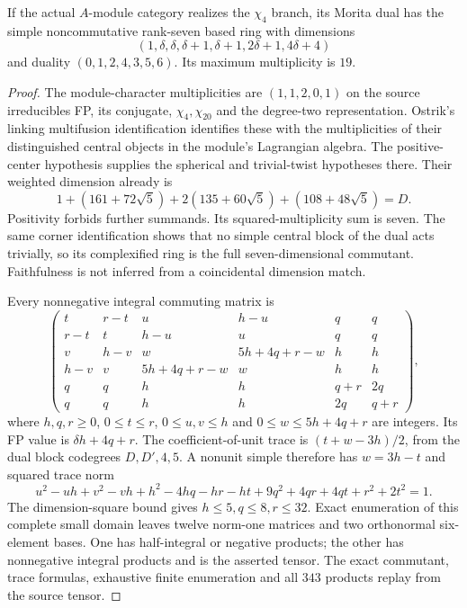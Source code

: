 \begin{proposition}\label{prop:r1154-conditional-rank7}
If the actual $A$-module category realizes the $\chi_4$ branch,
its Morita dual has the simple noncommutative rank-seven based ring
with dimensions
\[
(1,\delta,\delta,\delta+1,\delta+1,2\delta+1,4\delta+4)
\]
and duality $(0,1,2,4,3,5,6)$. Its maximum multiplicity is $19$.
\end{proposition}
\begin{proof}
The module-character multiplicities are $(1,1,2,0,1)$ on the source
irreducibles FP, its conjugate, $\chi_4,\chi_{20}$ and the degree-two
representation. Ostrik's linking multifusion identification
\cite[Remark~2.19]{OstrikPiv3} identifies these with the multiplicities
of their distinguished central objects in the module's Lagrangian
algebra. The positive-center hypothesis supplies the spherical and
trivial-twist hypotheses there. Their weighted dimension already is
\[
1+(161+72\sqrt5)+2(135+60\sqrt5)+(108+48\sqrt5)=D.
\]
Positivity forbids further summands. Its squared-multiplicity sum is
seven. The same corner identification shows that no simple central
block of the dual acts trivially, so its complexified ring is the full
seven-dimensional commutant. Faithfulness is not inferred from a
coincidental dimension match.

Every nonnegative integral commuting matrix is
\[
\begin{pmatrix}
t&r-t&u&h-u&q&q\\
r-t&t&h-u&u&q&q\\
v&h-v&w&5h+4q+r-w&h&h\\
h-v&v&5h+4q+r-w&w&h&h\\
q&q&h&h&q+r&2q\\
q&q&h&h&2q&q+r
\end{pmatrix},
\]
where $h,q,r\ge0$, $0\le t\le r$, $0\le u,v\le h$ and
$0\le w\le5h+4q+r$ are integers. Its FP value is $\delta h+4q+r$.
The coefficient-of-unit trace is $(t+w-3h)/2$, from the dual block
codegrees $D,D',4,5$. A nonunit simple therefore has $w=3h-t$ and
squared trace norm
\[
u^2-uh+v^2-vh+h^2-4hq-hr-ht
+9q^2+4qr+4qt+r^2+2t^2=1.
\]
The dimension-square bound gives $h\le5,q\le8,r\le32$.
Exact enumeration of this complete small domain leaves twelve norm-one
matrices and two orthonormal six-element bases. One has half-integral
or negative products; the other has nonnegative integral products and
is the asserted tensor. The exact commutant, trace formulas, exhaustive
finite enumeration and all $343$ products replay from the source tensor.
\end{proof}

